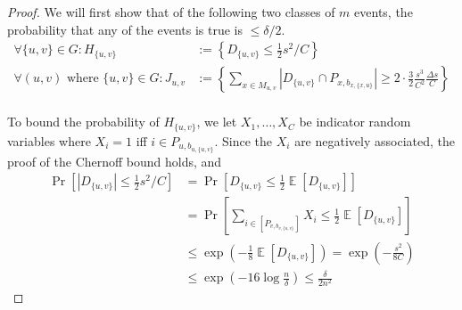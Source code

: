\documentclass[10pt]{article}
\theoremstyle{definition}\newtheorem{definition}[lemma]{Definition}
\theoremstyle{remark}  \newtheorem*{remark}{Remark}
\DeclareMathOperator{\EE}{\mathbb{E}}
\begin{document}
\begin{proof}
  We will first show that of the following two classes of $m$ events, the probability that any of the events is true is $\le \delta / 2$.
  \begin{align*}
    \forall \{u,v\} \in G: H_{\{u,v\}} & := \left\{ D_{\{u,v\}} \le \frac{1}{2} s^2/C \right\} \\
    \forall (u,v) \text{ where } \{u,v\} \in G: J_{u,v} & := \left\{ \sum_{x \in M_{u,v}} |D_{\{u,v\}} \cap P_{x,b_{x,\{x,u\}}}| \ge  2 \cdot \frac{3}{2} \frac{s^3}{C^2} \frac{\Delta s}{C} \right\} \\
  \end{align*}
  
  To bound the probability of $H_{\{u,v\}}$, we let $X_1,\ldots,X_C$ be indicator random variables where $X_i = 1$ iff $i \in P_{u, b_{u,\{u,v\}}}$.  Since the $X_i$ are negatively associated\cite{JoagDevP83}, the proof of the Chernoff bound holds, and 
  \begin{align*}
    \Pr[ |D_{\{u,v\}}| \le \frac{1}{2} s^2/C ] &= \Pr[ D_{\{u,v\}} \le \frac{1}{2} \EE[D_{\{u,v\}}] ] \\
       &= \Pr[ \sum_{i \in [P_{v, b_{v,\{u,v\}}}]} X_i \le \frac{1}{2} \EE[D_{\{u,v\}}] ] \\
       &\le \exp( - \frac{1}{8} \EE[D_{\{u,v\}}])= \exp(- \frac{s^2}{8 C} )  \\
       &\le \exp(- 16 \log\frac{n}{\delta}) \le \frac{\delta}{2 n^2}
  \end{align*}
  

\end{proof}
\end{document}
